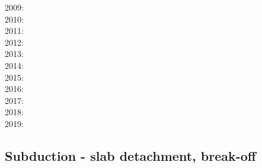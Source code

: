 {2009: \cite{yahb09}\cite{bill09}\cite{fagb09}\cite{bejb09}\cite{kecw09}\cite{gecm09}\cite{gefc09}
      \cite{famg09}\cite{lige09}\cite{moct09}\cite{lohb09}\cite{befa09}\cite{agyj09}\cite{yamb09}
      \cite{huby09}\\
2010: \cite{hagr10}\cite{lobh10}\cite{mamb10}\cite{camg10}\cite{casm10}\cite{ligb10}\cite{stfc10}
      \cite{moyb10}\cite{zhst10}\cite{qusp10}\cite{moht10}\cite{leki10}\cite{sigb10}\cite{stsf10}\\
2011: \cite{lixg11}\cite{list11}\cite{bubj11}\cite{bagw11b}\cite{cafz11}\cite{geme11}\cite{qube11}
      \cite{blgg11}\cite{gery11b}\cite{leki11}\cite{scsf11}\\
2012: \cite{anwb12}\cite{jahu12}\cite{jabi12}\cite{jabk12}\cite{lixg12}\cite{grpy12}\cite{grpy12b}
      \cite{ronb12}\cite{tebu12}\cite{thka12}\cite{bova12}\cite{civs12}\cite{camo12}\cite{cafa12} 
      \cite{gebk12}\cite{liri12}\cite{beva12}\cite{uegb12}\cite{bija12}\cite{sigb12}\\
2013: \cite{nabg13}\cite{hage13}\cite{ancv13}\cite{namu13}\cite{yosh13}\cite{zhgt13}\cite{lixg13} 
      \cite{jabr13}\cite{izht13}\cite{luws13}\cite{dusc13}\cite{tibb13}\cite{bubj13}\cite{scmo13} 
      \cite{fuob13}\cite{magc13}\cite{musi13}\cite{mibg13}\cite{grpy13}\cite{vagd13a}\cite{vagd13b}
      \cite{cavg13}\cite{vocg13}\cite{qula13}\cite{bugu13}\\
2014: \cite{robn14}\cite{hond14}\cite{ronc14}\cite{mobm14}\cite{famc14}\cite{fogm14}\cite{frba14} 
      \cite{gagd14}\cite{voge14}\cite{voge14b}\cite{lidr14}\cite{bocj04}\cite{bagb14}\cite{stjm14}
      \cite{basc14}\cite{vamd14}\cite{kile14}\cite{jahm14}\cite{bufa14}\cite{bufy14b}\cite{chsv14}
      \cite{chsg14}\cite{sigb14}\cite{shjm14}\\
2015: \cite{bemm15}\cite{bomv15}\cite{bogf15}\cite{ceag15}\cite{kifr15}\cite{vami15}\cite{dali15}\\
2016: \cite{tomy16}\cite{gukt16}\cite{robn16}\cite{mavm16}\\
2017: \cite{kicf17}\cite{sche17}\cite{pest17}\cite{vomc17}\cite{majf17}\cite{yabr17}\\
2018: \cite{yamz18}\cite{crli18}\cite{spcv18}\cite{chss18}\cite{yagz18}\cite{mazh18}\\
2019: \cite{magn19}\cite{mavb19}\cite{scvm19}\cite{cakc19}\cite{samo19}\cite{sihf19}\cite{meag19}
}

\subsection{Subduction - slab detachment, break-off}
 

